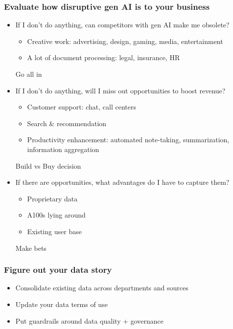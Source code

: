\begin{frame}[fragile]\frametitle{Evaluate how disruptive gen AI is to your business}

\begin{itemize}
\item If I don’t do anything, can competitors with gen AI make me obsolete?
	\begin{itemize}
		\item Creative work: advertising, design, gaming, media, entertainment
		\item A lot of document processing: legal, insurance, HR
	\end{itemize}	
		
		Go all in
\item If I don’t do anything, will I miss out opportunities to boost revenue?
	\begin{itemize}
		\item Customer support: chat, call centers
		\item Search \& recommendation
		\item Productivity enhancement: automated note-taking, summarization, information aggregation
	\end{itemize}	
	
	Build vs Buy decision

\item If there are opportunities, what advantages do I have to capture them?
	\begin{itemize}
		\item Proprietary data
		\item A100s lying around
		\item Existing user base
	\end{itemize}	
		
	Make bets
\end{itemize}	

\end{frame}

\begin{frame}[fragile]\frametitle{Figure out your data story}

\begin{itemize}
\item Consolidate existing data across departments and sources
\item Update your data terms of use 
\item Put guardrails around data quality + governance
\end{itemize}	

\end{frame}

